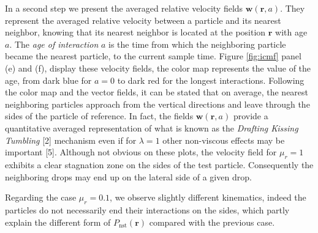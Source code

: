 \documentclass[9pt,a4paper]{article}
\begin{document}
In a second step we present the averaged relative velocity fields $\textbf{w}(\textbf{r},a)$.
They represent the averaged relative velocity between a particle and its nearest neighbor, knowing that its nearest neighbor is located at the position $\textbf{r}$ with age $a$.
The \textit{age of interaction} $a$ is the time from which the neighboring particle became the nearest particle, to the current sample time. 
Figure \ref{fig:icmf} panel (e) and (f), display these velocity fields, the color map represents the value of the age, from dark blue for $a = 0$ to dark red for the longest interactions. 
Following the color map and the vector fields, it can be stated that on average, the nearest neighboring particles approach from the vertical directions and leave through the sides of the particle of reference. 
In fact, the fields $\textbf{w}(\textbf{r},a)$ provide a quantitative averaged representation of what is known as the \textit{Drafting Kissing Tumbling} [2] mechanism even if for $\lambda=1$ other non-viscous effects may be important [5].
Although not obvious on these plots, the velocity field for $\mu_r = 1$ exhibits a clear stagnation zone on the sides of the test particle.
Consequently the neighboring drops may end up on the lateral side of a given drop. %

Regarding the case $\mu_r =0.1$, we observe slightly different kinematics, indeed the particles do not necessarily end their interactions on the sides, which partly explain the different form of $P_\text{nst}(\textbf{r})$ compared with the previous case.
\end{document}
